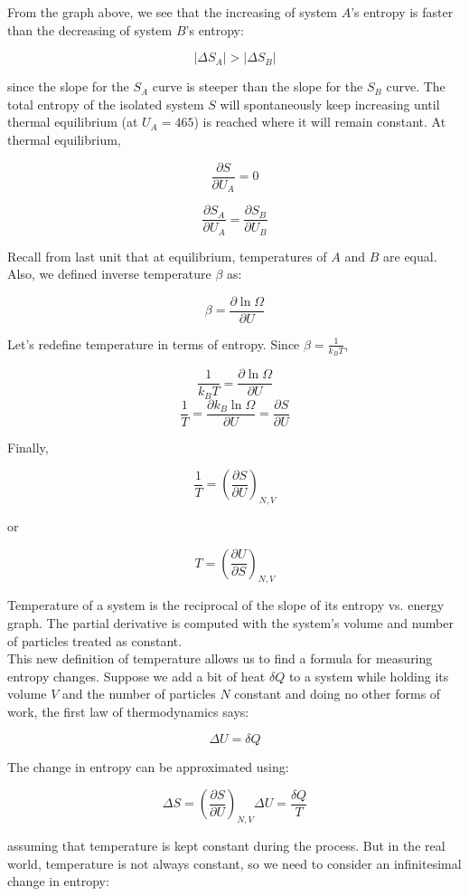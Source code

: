 From the graph above, we see that the increasing of system $A$'s entropy is faster than the decreasing of system $B$'s entropy:

\[|\Delta S_A|>|\Delta S_B|\]

since the slope for the $S_A$ curve is steeper than the slope for the $S_B$ curve. The total entropy of the isolated system $S$ will spontaneously keep increasing until thermal equilibrium (at $U_A=465$) is reached where it will remain constant. At thermal equilibrium,

\[\frac{\partial S}{\partial U_A}=0\]

\[\frac{\partial S_A}{\partial U_A}=\frac{\partial S_B}{\partial U_B}\]

Recall from last unit that at equilibrium, temperatures of $A$ and $B$ are equal. Also, we defined inverse temperature $\beta$ as:

\[\beta=\frac{\partial \ln\Omega}{\partial U}\]

Let's redefine temperature in terms of entropy. Since $\beta=\frac{1}{k_BT}$,

\[\frac{1}{k_BT}=\frac{\partial \ln\Omega}{\partial U}\]
\[\frac{1}{T}=\frac{\partial k_B\ln\Omega}{\partial U}=\frac{\partial S}{\partial U}\]

Finally,

\[\boxed{\frac{1}{T}=\left(\frac{\partial S}{\partial U}\right)_{N,V}}\]

or

\[\boxed{T=\left(\frac{\partial U}{\partial S}\right)_{N,V}}\]

Temperature of a system is the reciprocal of the slope of its entropy vs. energy graph. The partial derivative is computed with the system's volume and number of particles treated as constant. \\

This new definition of temperature allows us to find a formula for measuring entropy changes. Suppose we add a bit of heat $\delta Q$ to a system while holding its volume $V$ and the number of particles $N$ constant and doing no other forms of work, the first law of thermodynamics says:

\[\Delta U=\delta Q\]

The change in entropy can be approximated using:

\[\Delta S=\left(\frac{\partial S}{\partial U}\right)_{N,V} \Delta U=\frac{\delta Q}{T}\]

assuming that temperature is kept constant during the process. But in the real world, temperature is not always constant, so we need to consider an infinitesimal change in entropy:

